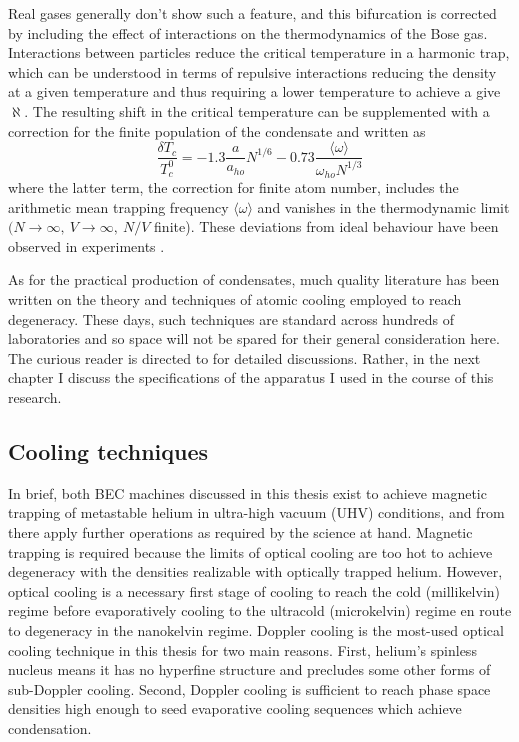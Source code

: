 	Real gases generally don't show such a feature, and this bifurcation is corrected by including the effect of interactions on the thermodynamics of the Bose gas.	 
	Interactions between particles reduce the critical temperature in a harmonic trap, which can be understood in terms of repulsive interactions reducing the density at a given temperature and thus requiring a lower temperature to achieve a give $\aleph$.
	The resulting shift in the critical temperature can be supplemented with a correction for the finite population of the condensate and written as
	\begin{equation}
		\frac{\delta T_c}{T_c^{0}} = -1.3 \frac{a}{a_{ho}} N^{1/6} -0.73\frac{ \langle\omega\rangle}{\omega_{ho} N^{1/3}}
	\end{equation}
	where the latter term, the correction for finite atom number, includes the arithmetic mean trapping frequency $\langle\omega\rangle$ and vanishes in the thermodynamic limit $(N\rightarrow\infty,~V\rightarrow\infty,~N/V$ finite).
	These deviations from ideal behaviour have been observed in experiments \cite{Tammuz11,Smith11}.

	As for the practical production of condensates, much quality literature has been written on the theory and techniques of atomic cooling employed to reach degeneracy.
	These days, such techniques are standard across hundreds of laboratories and so space will not be spared for their general consideration here.
	The curious reader is directed to \cite{MakingProbingUnderstanding,Courteille01,MetVdS, TychkovThesis} for detailed discussions.
	Rather, in the next chapter I discuss the specifications of the apparatus I used in the course of this research. 
	
\subsection{Cooling techniques}
	\label{sec:doppler_basics}
	In brief, both BEC machines discussed in this thesis exist to achieve magnetic trapping of metastable helium in ultra-high vacuum (UHV) conditions, and from there apply further operations as required by the science at hand.
	Magnetic trapping is required because the limits of optical cooling are too hot to achieve degeneracy with the densities realizable with optically trapped helium.
	However, optical cooling is a necessary first stage of cooling to reach the cold (millikelvin) regime before evaporatively cooling to the ultracold (microkelvin) regime en route to degeneracy in the nanokelvin regime.
	Doppler cooling is the most-used optical cooling technique in this thesis for two main reasons.
	First, helium's spinless nucleus means it has no hyperfine structure and precludes some other forms of sub-Doppler cooling.
	Second, Doppler cooling is sufficient to reach phase space densities high enough to seed evaporative cooling sequences which achieve condensation. 
	
